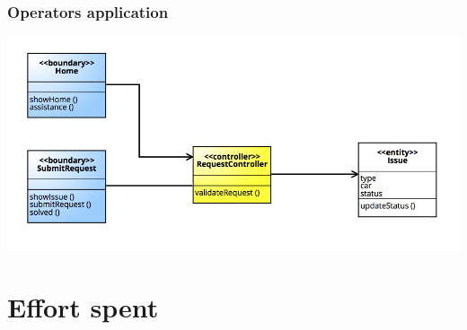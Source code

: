 \documentclass[]{article}
\begin{document}
\subsubsection{Operators application}\label{operators-application-1}

\centerline{\includegraphics{./images/BCE_Operator.png}}

\section{Effort spent}\label{effort-spent}
\end{document}
